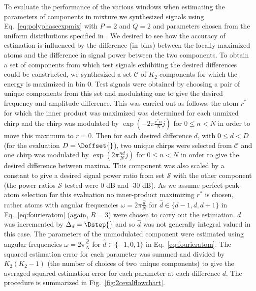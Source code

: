\documentclass[twoside,a4paper]{article}
\begin{document}
To evaluate the performance of the various windows when estimating the
parameters of components in mixture we synthesized signals using
Eq.~\ref{eq:polyphaseexpmix} with $P=2$ and $Q=2$ and parameters chosen from the
uniform distributions specified in \cite{betser2009sinusoidal}.  We desired to
see how the accuracy of estimation is influenced by the difference (in bins)
between the locally maximized atoms and the difference in signal power between
the two components. To obtain a set of components from which test signals
exhibiting the desired differences could be constructed, we synthesized a set
$\mathcal{C}$ of $K_{2}$ components for which the energy is maximized in bin 0.
Test signals were obtained by choosing a pair of unique components from this set
and modulating one to give the desired frequency and amplitude difference.  This was carried out as
follows: the atom $r^{\ast}$ for which the inner product was maximized was
determined for each unmixed chirp and the chirp was modulated by $\exp(-2\pi
\frac{r^{\ast} n}{N}j)$ for $0 \leq n < N$ in order to move this maximum
to $r=0$. Then for each desired difference $d$, with $0 \leq d < D$ (for the
evaluation $D = \Doffset{}$), two unique
chirps were selected from $\mathcal{C}$ and one chirp was modulated by
$\exp(2\pi \frac{n d}{N}j)$ for $0 \leq n < N$ in order to give the
desired difference between maxima. This component was also scaled by a constant
to give a desired signal power ratio from set $\mathcal{S}$ with the other component (the power ratios
$\mathcal{S}$ tested were 0 dB and -30 dB). As we assume perfect peak-atom selection for this
evaluation no inner-product maximizing $r^{\ast}$ is chosen, rather atoms with
angular frequencies $\omega=2\pi\frac{\hat{d}}{N}$ for $\hat{d} \in
\{d-1,d,d+1\}$ in Eq.~\ref{eq:fourieratom} (again, $R=3$) were chosen to carry
out the estimation. $d$ was incremented by $\Delta_{d} = \Dstep{}$ and so
$\hat{d}$ was not generally integral valued in this case. The parameters of the
unmodulated component were estimated using angular frequencies
$\omega=2\pi\frac{\hat{d}}{N}$ for $\hat{d} \in\{-1,0,1\}$ in
Eq.~\ref{eq:fourieratom}. The squared
estimation error for each parameter was summed and divided by $K_{2}(K_{2}-1)$
(the number of choices of two unique components) to give the averaged squared
estimation error for each parameter at each difference $d$. The procedure is
summarized in Fig.~\ref{fig:2cevalflowchart}.
\end{document}
